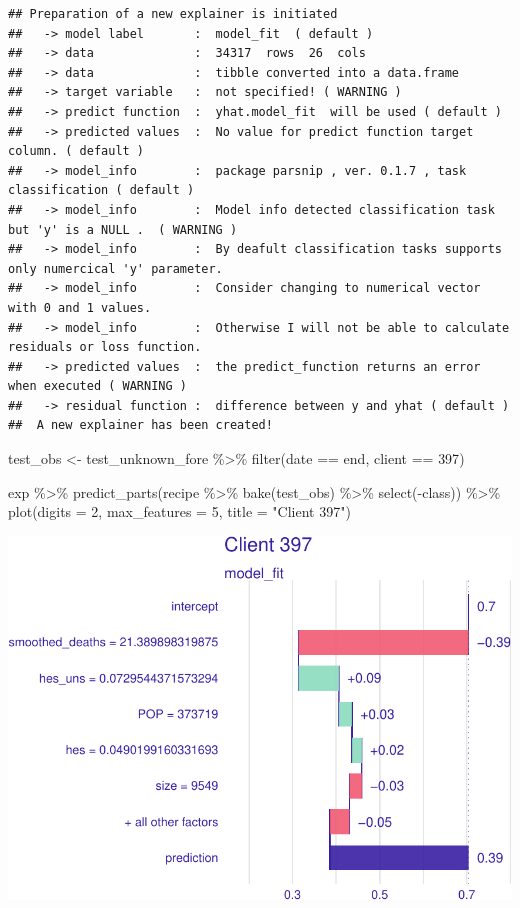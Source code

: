 \documentclass[
]{article}
\newenvironment{Shaded}{\begin{snugshade}}{\end{snugshade}}
\newcommand{\AttributeTok}[1]{\textcolor[rgb]{0.77,0.63,0.00}{#1}}
\newcommand{\DecValTok}[1]{\textcolor[rgb]{0.00,0.00,0.81}{#1}}
\newcommand{\FunctionTok}[1]{\textcolor[rgb]{0.00,0.00,0.00}{#1}}
\newcommand{\NormalTok}[1]{#1}
\newcommand{\OtherTok}[1]{\textcolor[rgb]{0.56,0.35,0.01}{#1}}
\newcommand{\SpecialCharTok}[1]{\textcolor[rgb]{0.00,0.00,0.00}{#1}}
\newcommand{\StringTok}[1]{\textcolor[rgb]{0.31,0.60,0.02}{#1}}
\begin{document}
\begin{verbatim}
## Preparation of a new explainer is initiated
##   -> model label       :  model_fit  ( default )
##   -> data              :  34317  rows  26  cols 
##   -> data              :  tibble converted into a data.frame 
##   -> target variable   :  not specified! ( WARNING )
##   -> predict function  :  yhat.model_fit  will be used ( default )
##   -> predicted values  :  No value for predict function target column. ( default )
##   -> model_info        :  package parsnip , ver. 0.1.7 , task classification ( default ) 
##   -> model_info        :  Model info detected classification task but 'y' is a NULL .  ( WARNING )
##   -> model_info        :  By deafult classification tasks supports only numercical 'y' parameter. 
##   -> model_info        :  Consider changing to numerical vector with 0 and 1 values.
##   -> model_info        :  Otherwise I will not be able to calculate residuals or loss function.
##   -> predicted values  :  the predict_function returns an error when executed ( WARNING ) 
##   -> residual function :  difference between y and yhat ( default )
##  A new explainer has been created! 
\end{verbatim}

\begin{Shaded}
\begin{Highlighting}[]
\NormalTok{test\_obs }\OtherTok{\textless{}{-}}
\NormalTok{  test\_unknown\_fore }\SpecialCharTok{\%\textgreater{}\%}
  \FunctionTok{filter}\NormalTok{(date }\SpecialCharTok{==}\NormalTok{ end, client }\SpecialCharTok{==} \DecValTok{397}\NormalTok{)}

\NormalTok{exp }\SpecialCharTok{\%\textgreater{}\%}
\FunctionTok{predict\_parts}\NormalTok{(recipe }\SpecialCharTok{\%\textgreater{}\%} \FunctionTok{bake}\NormalTok{(test\_obs) }\SpecialCharTok{\%\textgreater{}\%} \FunctionTok{select}\NormalTok{(}\SpecialCharTok{{-}}\NormalTok{class)) }\SpecialCharTok{\%\textgreater{}\%}
  \FunctionTok{plot}\NormalTok{(}\AttributeTok{digits =} \DecValTok{2}\NormalTok{, }\AttributeTok{max\_features =} \DecValTok{5}\NormalTok{, }\AttributeTok{title =} \StringTok{"Client 397"}\NormalTok{)}
\end{Highlighting}
\end{Shaded}

\includegraphics{figures/report/fig-unnamed-chunk-60-1.pdf}
\end{document}
